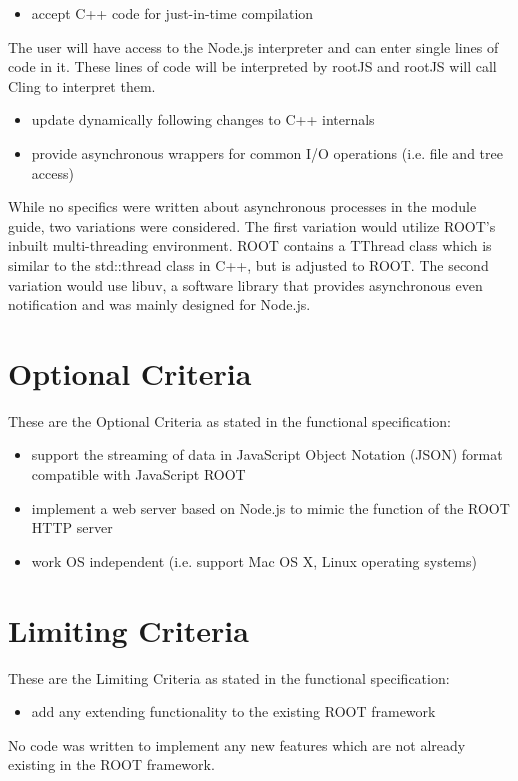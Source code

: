 \begin{itemize}
	\item accept C++ code for just-in-time compilation
\end{itemize}
The user will have access to the Node.js interpreter and can enter single lines of code in it. 
These lines of code will be interpreted by rootJS and rootJS will call Cling to interpret them.

\begin{itemize}
	\item update dynamically following changes to C++ internals
\end{itemize}


\begin{itemize}
	\item provide asynchronous wrappers for common I/O operations (i.e. file and tree access)
\end{itemize}
While no specifics were written about asynchronous processes in the module guide, two variations were considered. The first variation would utilize ROOT's inbuilt 
multi-threading environment. ROOT contains a TThread class which is similar to the std::thread class in C++, but is adjusted to ROOT. 
The second variation would use libuv, a software library that provides asynchronous even notification and was mainly designed for Node.js. 

\section{Optional Criteria}
These are the Optional Criteria as stated in the functional specification:
\begin{itemize}
	\item support the streaming of data in JavaScript Object Notation (JSON) format compatible with JavaScript ROOT
\end{itemize}


\begin{itemize}
	\item implement a web server based on Node.js to mimic the function of the ROOT HTTP server
\end{itemize}


\begin{itemize}
	\item work OS independent (i.e. support Mac OS X, Linux operating systems)
\end{itemize}

\section{Limiting Criteria}
These are the Limiting Criteria as stated in the functional specification:
\begin{itemize}
	\item add any extending functionality to the existing ROOT framework
\end{itemize}
No code was written to implement any new features which are not already existing in the ROOT framework. 

